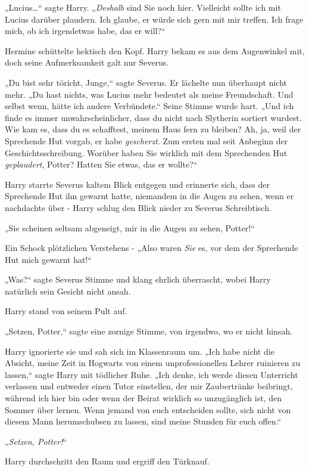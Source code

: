 {„Lucius…“ sagte Harry. „\emph{Deshalb} sind Sie noch hier. Vielleicht sollte ich mit Lucius darüber plaudern. Ich glaube, er würde sich gern mit mir treffen. Ich frage mich, ob ich irgendetwas habe, das er will?“

Hermine schüttelte hektisch den Kopf. Harry bekam es aus dem Augenwinkel mit, doch seine Aufmerksamkeit galt nur Severus.

„Du bist sehr töricht, Junge,“ sagte Severus. Er lächelte nun überhaupt nicht mehr. „Du hast nichts, was Lucius mehr bedeutet als meine Freundschaft. Und selbst wenn, hätte ich andere Verbündete.“ Seine Stimme wurde hart. „Und ich finde es immer unwahrscheinlicher, dass du nicht nach Slytherin sortiert wurdest. Wie kam es, dass du es schafftest, meinem Haus fern zu bleiben? Ah, ja, weil der Sprechende Hut vorgab, er habe \emph{gescherzt}. Zum ersten mal seit Anbeginn der Geschichtsschreibung. Worüber haben Sie wirklich mit dem Sprechenden Hut \emph{geplaudert}, Potter? Hatten Sie etwas, das er wollte?“

Harry starrte Severus kaltem Blick entgegen und erinnerte sich, dass der Sprechende Hut ihn gewarnt hatte, niemandem in die Augen zu sehen, wenn er nachdachte über - Harry schlug den Blick nieder zu Severus Schreibtisch.

„Sie scheinen seltsam abgeneigt, mir in die Augen zu sehen, Potter!“

Ein Schock plötzlichen Verstehens - „Also waren \emph{Sie} es, vor dem der Sprechende Hut mich gewarnt hat!“

„Was?“ sagte Severus Stimme und klang ehrlich überrascht, wobei Harry natürlich sein Gesicht nicht ansah.

Harry stand von seinem Pult auf.

„Setzen, Potter,“ sagte eine zornige Stimme, von irgendwo, wo er nicht hinsah.

Harry ignorierte sie und sah sich im Klassenraum um. „Ich habe nicht die Absicht, meine Zeit in Hogwarts von einem unprofessionellen Lehrer ruinieren zu lassen,“ sagte Harry mit tödlicher Ruhe. „Ich denke, ich werde diesen Unterricht verlassen und entweder einen Tutor einstellen, der mir Zaubertränke beibringt, während ich hier bin oder wenn der Beirat wirklich so unzugänglich ist, den Sommer über lernen. Wenn jemand von euch entscheiden sollte, sich nicht von diesem Mann herumschubsen zu lassen, sind meine Stunden für euch offen.“

„\emph{Setzen, Potter!}“

Harry durchschritt den Raum und ergriff den Türknauf.

}
